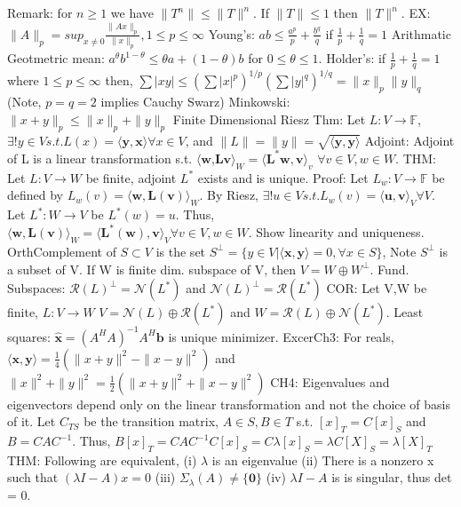 \documentclass[8pt]{extarticle}
\theoremstyle{definition}
\begin{document}
{Remark: for $n \geq 1$ we have $\|T^n\| \leq \|T\|^n$. If $\|T\| \leq 1$ then $\|T\|^n$.
EX: $\|A\|_p = sup_{x \neq 0} \frac{\|Ax\|_p}{\|x\|_p}, 1 \leq p \leq \infty$
Young's: $ab \leq \frac{a^p}{p} + \frac{b^q}{q}$ if $\frac{1}{p}+ \frac{1}{q} = 1$
Arithmatic Geotmetric mean: $a^\theta b^{1-\theta} \leq \theta a +(1-\theta)b$ for $0\leq \theta \leq 1$.
Holder's: if $\frac{1}{p} + \frac{1}{q} = 1$ where $1\leq p \leq \infty$ then, $\sum |xy| \leq (\sum|x|^p)^{1/p}(\sum|y|^q)^{1/q} = \|x\|_p\|y\|_q$
(Note, $p=q=2$ implies Cauchy Swarz)
Minkowski: $\|x+y\|_p \leq \|x\|_p + \|y\|_p$
Finite Dimensional Riesz Thm: Let $L:V \rightarrow \mathbb{F}$, $\exists! y \in V s.t. L(x) = \langle \mathbf{y}, \mathbf{x} \rangle \forall x \in V$, and $\|L\| = \|y\| = \sqrt{\langle \mathbf{y}, \mathbf{y} \rangle}$
Adjoint: Adjoint of L is a linear transformation s.t. $\langle \mathbf{w}$,$ \mathbf{Lv} \rangle_W = \langle \mathbf{L^*w}, \mathbf{v} \rangle _v$ $ \forall v \in V, w \in W$. 
THM: Let $L:V\rightarrow W$ be finite, adjoint $L^*$ exists and is unique.
Proof: Let $L_w:V\rightarrow \mathbb{F}$ be defined by $L_w(v) = \langle \mathbf{w}, \mathbf{L(v)} \rangle _W$. By Riesz, $\exists! u \in V s.t. L_w(v) = \langle \mathbf{u}, \mathbf{v} \rangle_V \forall V$. Let $L^*:W \rightarrow V$ be $L^*(w) = u$. Thus, $\langle \mathbf{w}, \mathbf{L(v)} \rangle_W = \langle \mathbf{L^*(w)}, \mathbf{v} \rangle_V \forall v \in V, w \in W$. Show linearity and uniqueness.
OrthComplement of $ S \subset V$ is the set $S^\bot = \{y \in V|\langle \mathbf{x}, \mathbf{y} \rangle = 0, \forall x \in S\}$, 
Note $S^\bot$ is a subset of V. If W is finite dim. subspace of V, then $V = W \oplus W^\bot$. 
Fund. Subspaces: $\mathscr{R}(L)^\bot = \mathscr{N}(L^*)$ and $\mathscr{N}(L)^\bot = \mathscr{R}(L^*)$
COR: Let V,W be finite, $L:V \rightarrow W$ $V = \mathscr{N}(L) \oplus \mathscr{R}(L^*)$ and $W = \mathscr{R}(L) \oplus \mathscr{N}(L^*)$.
Least squares: $\hat{ \mathbf{x}} = (A^HA)^{-1}A^H \mathbf{b}$ is unique minimizer.
ExcerCh3: For reals, $\langle \mathbf{x}, \mathbf{y} \rangle = \frac{1}{4}(\|x+y\|^2 - \|x-y\|^2)$ and $\|x\|^2 +\|y\|^2 = \frac{1}{2}(\|x+y\|^2 + \|x-y\|^2)$
CH4: Eigenvalues and eigenvectors depend only on the linear transformation and not the choice of basis of it. Let $C_{TS}$ be the transition matrix, $A \in S, B \in T$ s.t. $[x]_T = C[x]_S$ and $B = CAC^{-1}$. Thus, 
$B[x]_T = C A C^{-1} C[x]_S = C\lambda[x]_S = \lambda C[X]_S = \lambda[X]_T$
THM: Following are equivalent, (i) $\lambda$ is an eigenvalue (ii) There is a nonzero x such that $(\lambda I -A)x = 0$ (iii) $\Sigma_\lambda(A) \neq \{\mathbf{0}\}$ (iv) $\lambda I -A$ is is singular, thus det = 0.
}
\end{document}
